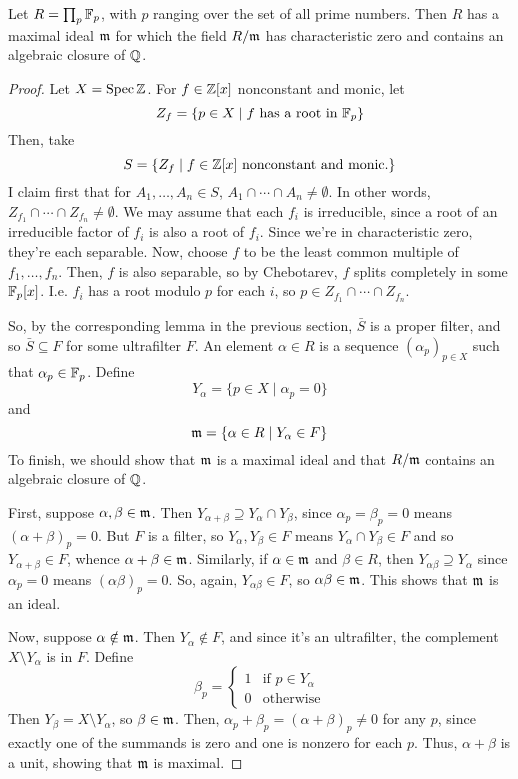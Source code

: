 \documentclass[12pt]{exam}
\begin{document}
\begin{thm} Let $R = \prod_p \mathbb{F}_p$, with $p$ ranging over the set of all prime numbers. Then $R$ has a maximal ideal $\mathfrak{m}$ for which the field $R/\mathfrak{m}$ has characteristic zero and contains an algebraic closure of $\mathbb{Q}$. \end{thm}
\begin{proof}
	Let $X = \operatorname{Spec}\mathbb{Z}$. For $f \in \mathbb{Z}[x]$ nonconstant and monic, let
	\[ Z_f = \{ p \in X \mid f \text{ has a root in } \mathbb{F}_p \} \]
	Then, take
	\[ S = \{ Z_f \mid f \in \mathbb{Z}[x] \text{ nonconstant and monic.} \} \]
	I claim first that for $A_1,\ldots,A_n \in S$, $A_1 \cap \cdots \cap A_n \neq \emptyset$. In other words, $Z_{f_1} \cap \cdots \cap Z_{f_n} \neq \emptyset$. We may assume that each $f_i$ is irreducible, since a root of an irreducible factor of $f_i$ is also a root of $f_i$. Since we're in characteristic zero, they're each separable. Now, choose $f$ to be the least common multiple of $f_1,\ldots,f_n$. Then, $f$ is also separable, so by Chebotarev, $f$ splits completely in some $\mathbb{F}_p[x]$. I.e. $f_i$ has a root modulo $p$ for each $i$, so $p \in Z_{f_1} \cap \cdots \cap Z_{f_n}$.
	
	So, by the corresponding lemma in the previous section, $\bar{S}$ is a proper filter, and so $\bar{S} \subseteq F$ for some ultrafilter $F$. An element $\alpha \in R$ is a sequence $(\alpha_p)_{p \in X}$ such that $\alpha_p \in \mathbb{F}_p$. Define
	\[ Y_\alpha = \{ p \in X \mid \alpha_p = 0 \} \]
	and
	\[ \mathfrak{m} = \{ \alpha \in R \mid Y_\alpha \in F \} \]
	To finish, we should show that $\mathfrak{m}$ is a maximal ideal and that $R/\mathfrak{m}$ contains an algebraic closure of $\mathbb{Q}$.
	
	First, suppose $\alpha,\beta \in \mathfrak{m}$. Then $Y_{\alpha+\beta} \supseteq Y_\alpha \cap Y_\beta$, since $\alpha_p = \beta_p = 0$ means $(\alpha+\beta)_p = 0$. But $F$ is a filter, so $Y_\alpha,Y_\beta \in F$ means $Y_\alpha \cap Y_\beta \in F$ and so $Y_{\alpha+\beta} \in F$, whence $\alpha+\beta \in \mathfrak{m}$. Similarly, if $\alpha \in \mathfrak{m}$ and $\beta \in R$, then $Y_{\alpha\beta} \supseteq Y_\alpha$ since $\alpha_p = 0$ means $(\alpha\beta)_p = 0$. So, again, $Y_{\alpha\beta} \in F$, so $\alpha\beta \in \mathfrak{m}$. This shows that $\mathfrak{m}$ is an ideal.
	
	Now, suppose $\alpha \notin \mathfrak{m}$. Then $Y_\alpha \notin F$, and since it's an ultrafilter, the complement $X \setminus Y_\alpha$ is in $F$. Define
	\[ \beta_p = \begin{cases} 1 & \text{if } p \in Y_\alpha \\ 0 & \text{otherwise} \end{cases} \]
	Then $Y_\beta = X \setminus Y_\alpha$, so $\beta \in \mathfrak{m}$. Then, $\alpha_p + \beta_p = (\alpha+\beta)_p \neq 0$ for any $p$, since exactly one of the summands is zero and one is nonzero for each $p$. Thus, $\alpha+\beta$ is a unit, showing that $\mathfrak{m}$ is maximal.
	

\end{proof}
\end{document}
